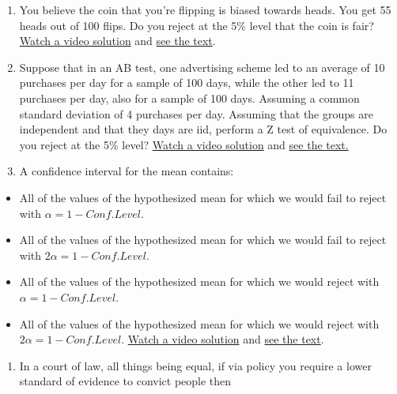 \documentclass[]{article}
\begin{document}
\begin{enumerate}
{  the text}.
\item
  You believe the coin that you're flipping is biased towards heads. You
  get 55 heads out of 100 flips. Do you reject at the 5\% level that the
  coin is fair?
  \href{https://www.youtube.com/watch?v=0sqOErsfhqo\&list=PLpl-gQkQivXhHOcVeU3bSJg78zaDYbP9L\&index=30}{Watch
  a video solution} and
  \href{http://bcaffo.github.io/courses/06_StatisticalInference/homework/hw4.html\#6}{see
  the text}.
\item
  Suppose that in an AB test, one advertising scheme led to an average
  of 10 purchases per day for a sample of 100 days, while the other led
  to 11 purchases per day, also for a sample of 100 days. Assuming a
  common standard deviation of 4 purchases per day. Assuming that the
  groups are independent and that they days are iid, perform a Z test of
  equivalence. Do you reject at the 5\% level?
  \href{https://www.youtube.com/watch?v=Or4ly4rOiaA\&index=32\&list=PLpl-gQkQivXhHOcVeU3bSJg78zaDYbP9L}{Watch
  a video solution} and
  \href{http://bcaffo.github.io/courses/06_StatisticalInference/homework/hw4.html\#8}{see
  the text.}
\item
  A confidence interval for the mean contains:
\end{enumerate}

\begin{itemize}
\itemsep1pt\parskip0pt
\item
  All of the values of the hypothesized mean for which we would fail to
  reject with $\alpha = 1 - Conf. Level$.
\item
  All of the values of the hypothesized mean for which we would fail to
  reject with $2 \alpha = 1 - Conf. Level$.
\item
  All of the values of the hypothesized mean for which we would reject
  with $\alpha = 1 - Conf. Level$.
\item
  All of the values of the hypothesized mean for which we would reject
  with $2 \alpha = 1 - Conf. Level$.
  \href{https://www.youtube.com/watch?v=UiNV1mXQGLs\&index=33\&list=PLpl-gQkQivXhHOcVeU3bSJg78zaDYbP9L}{Watch
  a video solution} and
  \href{http://bcaffo.github.io/courses/06_StatisticalInference/homework/hw4.html\#9}{see
  the text}.
\end{itemize}

\begin{enumerate}
\def\labelenumi{\arabic{enumi}.}
\setcounter{enumi}{8}
\itemsep1pt\parskip0pt
\item
  In a court of law, all things being equal, if via policy you require a
  lower standard of evidence to convict people then
\end{enumerate}
\end{document}
